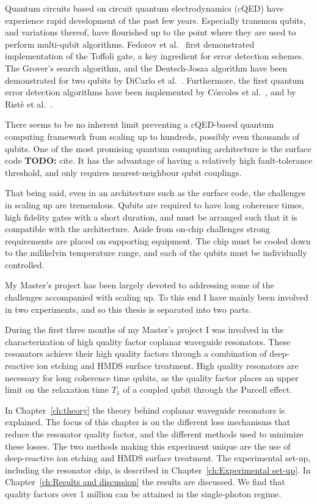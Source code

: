 \documentclass[12pt]{report}
\begin{document}
  Quantum circuits based on circuit quantum electrodynamics (cQED) have experience rapid development of the past few years. Especially transmon qubits, and variations thereof, have flourished up to the point where they are used to perform multi-qubit algorithms. Fedorov et al.~\cite{fedorov2011implementation} first demonstrated implementation of the Toffoli gate, a key ingredient for error detection schemes. The Grover's search algorithm, and the Deutsch-Josza algorithm have been demonstrated for two qubits by DiCarlo et al.~\cite{dicarlo2009demonstration}. Furthermore, the first quantum error detection algorithms have been implemented by C\'orcoles et al.~\cite{corcoles2015demonstration}, and by Rist\`e et al.~\cite{riste2014detecting}.

  There seems to be no inherent limit preventing a cQED-based quantum computing framework from scaling up to hundreds, possibly even thousands of qubits. One of the most promising quantum computing architecture is the surface code \textbf{TODO:} cite. It has the advantage of having a relatively high fault-tolerance threshold, and only requires nearest-neighbour qubit couplings.

  That being said, even in an architecture such as the surface code, the challenges in scaling up are tremendous. Qubits are required to have long coherence times, high fidelity gates with a short duration, and must be arranged such that it is compatible with the architecture. Aside from on-chip challenges strong requirements are placed on supporting equipment. The chip must be cooled down to the milikelvin temperature range, and each of the qubits must be individually controlled.

  My Master's project has been largely devoted to addressing some of the challenges accompanied with scaling up. To this end I have mainly been involved in two experiments, and so this thesis is separated into two parts.

  During the first three months of my Master's project I was involved in the characterization of high quality factor coplanar waveguide resonators. These resonators achieve their high quality factors through a combination of deep-reactive ion etching and HMDS surface treatment. High quality resonators are necessary for long coherence time qubits, as the quality factor places an upper limit on the relaxation time $T_1$ of a coupled qubit through the Purcell effect.

  In Chapter~\ref{ch:theory} the theory behind coplanar waveguide resonators is explained. The focus of this chapter is on the different loss mechanisms that reduce the resonator quality factor, and the different methods used to minimize these losses. The two methods making this experiment unique are the use of deep-reactive ion etching and HMDS surface treatment. The experimental set-up, including the resonator chip, is described in Chapter~\ref{ch:Experimental set-up}. In Chapter~\ref{ch:Results and discussion} the results are discussed. We find that quality factors over 1 million can be attained in the single-photon regime.
\end{document}
